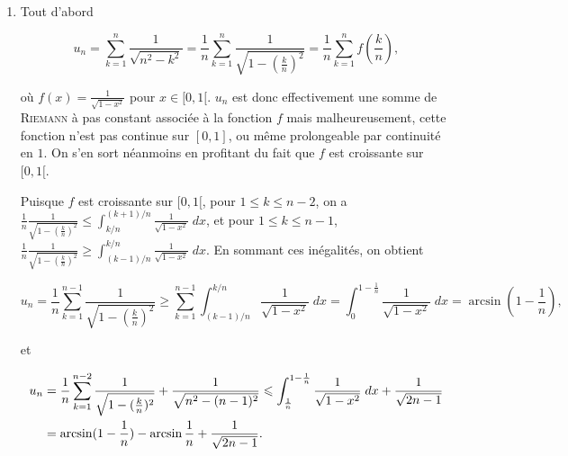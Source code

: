 \documentclass[11pt,a4paper]{article}
\newcommand{\Arcsin}{\mathop{\mathrm{arcsin}}\nolimits}
\begin{document}
\begin{enumerate}
$$\frac{n+k}{n^2+n}\leq\frac{n+k}{n^2+k}\leq\frac{n+k}{n^2}.$$

En sommant ces inégalités, il vient 

$$\frac{1}{n^2+n}\sum_{k=1}^{n}(n+k)\leq\sum_{k=1}^{n}\frac{n+k}{n^2+k}\leq\frac{1}{n^2}\sum_{k=1}^{n}(n+k),$$

et donc ((premier terme + dernier terme)$\times$nombre de termes/2),

$$\frac{1}{n^2+n}\frac{((n+1)+2n)n}{2}\leq u_n\leq\frac{1}{n^2}\frac{((n+1)+2n)n}{2},$$

et finalement, $\frac{3n+1}{2(n+1)}\leq u_n\leq\frac{3n+1}{2n}$. Or, $\frac{3n+1}{2(n+1)}$ et $\frac{3n+1}{2n}$ tendent tous deux vers $\frac{3}{2}$. Donc, $u_n$ tend vers $\frac{3}{2}$.

\item  Tout d'abord

$$u_n=\sum_{k=1}^{n}\frac{1}{\sqrt{n^2-k^2}}=\frac{1}{n}\sum_{k=1}^{n}\frac{1}{\sqrt{1-(\frac{k}{n})^2}}=
\frac{1}{n}\sum_{k=1}^{n}f(\frac{k}{n}),$$ 

où $f(x)=\frac{1}{\sqrt{1-x^2}}$ pour $x\in[0,1[$. $u_n$ est donc effectivement une somme de \textsc{Riemann} à pas constant associée à la fonction $f$ mais malheureusement, cette fonction n'est pas continue sur $[0,1]$, ou même prolongeable par continuité en $1$. On s'en sort néanmoins en profitant du fait que $f$ est croissante sur $[0,1[$.

Puisque $f$ est croissante sur $[0,1[$, pour $1\leq k\leq n-2$, on a $\frac{1}{n}\frac{1}{\sqrt{1-(\frac{k}{n})^2}}\leq\int_{k/n}^{(k+1)/n}\frac{1}{\sqrt{1-x^2}}\;dx$, et pour $1\leq k\leq n-1$, $\frac{1}{n}\frac{1}{\sqrt{1-(\frac{k}{n})^2}}\geq\int_{(k-1)/n}^{k/n}\frac{1}{\sqrt{1-x^2}}\;dx$. En sommant ces inégalités, on obtient

$$u_n=\frac{1}{n}\sum_{k=1}^{n-1}\frac{1}{\sqrt{1-(\frac{k}{n})^2}}\geq\sum_{k=1}^{n-1}\int_{(k-1)/n}^{k/n}\frac{1}{\sqrt{1-x^2}}\;dx=\int_{0}^{1-\frac{1}{n}}\frac{1}{\sqrt{1-x^2}}\;dx=\Arcsin(1-\frac{1}{n}),$$

et 

\begin{align*}\ensuremath
u_n&=\frac{1}{n}\sum_{k=1}^{n-2}\frac{1}{\sqrt{1-(\frac{k}{n})^2}}+\frac{1}{\sqrt{n^2-(n-1)^2}}\leq\int_{\frac{1}{n}}^{1-\frac{1}{n}}\frac{1}{\sqrt{1-x^2}}\;dx+\frac{1}{\sqrt{2n-1}}\\
 &=\Arcsin(1-\frac{1}{n})-\Arcsin\frac{1}{n}+\frac{1}{\sqrt{2n-1}}.
\end{align*}


\end{enumerate}
\end{document}
